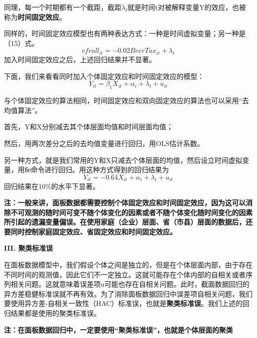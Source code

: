 \documentclass[cn,12pt,math=newtx,citestyle=gb7714-2015,bibstyle=gb7714-2015]{elegantbook}
\begin{document}
同理，每一个时期都有一个截距，截距$\lambda_t$就是时间t对被解释变量Y的效应，也被称为\textbf{时间固定效应}。

同样的，时间固定效应模型也有两种表达方式：一种是时间虚拟变量；另一种是（15）式。
\begin{equation}
	vfrall_{it}=-0.02BeerTax_{it}+\lambda_t
\end{equation}
加入时间固定效应之后，上述回归结果并不显著。

下面，我们来看看同时加入个体固定效应和时间固定效应的模型：
\begin{equation}
	Y_{it}=\beta_{1}X_{it}+\alpha_i+\lambda_t+u_{it}
\end{equation}

与个体固定效应的算法相同，时间固定效应和双向固定效应的算法也可以采用“去均值算法”。

首先，Y和X分别减去其个体层面均值和时间层面均值；

然后，用两次差分之后的去均值变量进行回归，用OLS估计系数。

另一种方式，就是我们常用的Y和X只减去个体层面的均值，然后设立时间虚拟变量，用\textbf{fe}命令进行回归。用这种方式得到的回归结果为
\begin{equation}
	Y_{it}=-0.64X_{it}+\alpha_i+\lambda_t+u_{it}
\end{equation}
回归结果在10\%的水平下显著。

\textbf{注：一般来讲，面板数据都需要控制个体固定效应和时间固定效应，因为这可以消除不可观测的随时间可变不随个体变化的因素或者不随个体变化随时间变化的因素所引起的遗漏变量偏误。在使用家庭（企业）层面、省（市县）层面的数据后，还要同时控制家庭固定效应、省固定效应和时间固定效应。}

\textbf{III. 聚类标准误}

在面板数据模型中，我们假设个体之间是独立的，但是在个体层面内部，由于存在不同时间的观测值，因此它们不一定独立。这就可能存在个体内部的自相关或者序列相关问题。这就意味着误差项u可能也存在自相关问题。此时，截面数据回归的异方差稳健标准误就不再有效。为了消除面板数据回归中误差项自相关问题，我们要使用异方差-自相关一致性（HAC）标准误，也就是\textbf{聚类标准误}。我们上述的回归结果都是使用的聚类标准误。

\textbf{注：在面板数据回归中，一定要使用“聚类标准误”，也就是个体层面的聚类}
\end{document}
